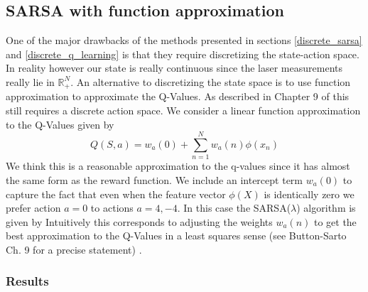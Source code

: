 \documentclass{article}
\begin{document}
\subsection{SARSA with function approximation}
\label{sarsa_function_approximation}

One of the major drawbacks of the methods presented in sections \ref{discrete_sarsa} and \ref{discrete_q_learning} is that they require discretizing the state-action space. In reality however our state is really continuous since the laser measurements really lie in $\mathbb{R}_+^N$. An alternative to discretizing the state space is to use function approximation to approximate the Q-Values. As described in Chapter 9 of  this still requires a discrete action space. We consider a linear function approximation to the Q-Values given by
%
%
%
\begin{equation}
\label{q_value_approx}
Q(S,a) = w_a(0) + \sum_{n = 1}^N w_a(n)\phi(x_n)
\end{equation}
%
%
We think this is a reasonable approximation to the q-values since it has almost the same form as the reward function. We include an intercept term $w_a(0)$ to capture the fact that even when the feature vector $\phi(X)$ is identically zero we prefer action $a = 0$ to actions $a=4,-4$. In this case the SARSA($\lambda$) algorithm is given by
%
%
%
%
Intuitively this corresponds to adjusting the weights $w_a(n)$ to get the best approximation to the Q-Values in a least squares sense (see Button-Sarto Ch. 9 for a precise statement) . 


\subsubsection{Results}
\end{document}
